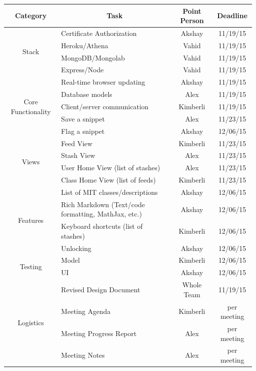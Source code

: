 \documentclass{article}
\begin{document}
 \begin{table}[!htbp]
 \centering
\begin{tabular}{|c| l |c|c|}
\hline
\textbf{Category} & \multicolumn{1}{|c|}{\textbf{Task}} & \textbf{Point Person} & \textbf{Deadline} \\
\hline

\multirow{4}{*}{Stack}
& Certificate Authorization  & Akshay  &  11/19/15 \\\cline{2-4}
& Heroku/Athena    & Vahid  &  11/19/15    \\\cline{2-4}
& MongoDB/Mongolab & Vahid  &  11/19/15    \\\cline{2-4}
& Express/Node  & Vahid  &  11/19/15    \\\cline{2-4}
\hline

\multirow{5}{*}{Core Functionality}
& Real-time browser updating  & Akshay  &  11/19/15 \\\cline{2-4}
& Database models    & Alex  &  11/19/15    \\\cline{2-4}
& Client/server communication & Kimberli  &  11/19/15    \\\cline{2-4}
& Save a snippet & Alex  &  11/23/15    \\\cline{2-4}
& Flag a snippet & Akshay  &  12/06/15    \\\cline{2-4}
\hline

\multirow{4}{*}{Views}
& Feed View  & Kimberli  &  11/23/15 \\\cline{2-4}
& Stash View  & Alex  &  11/23/15    \\\cline{2-4}
& User Home View (list of stashes)  & Alex  &  11/23/15    \\\cline{2-4}
& Class Home View (list of feeds) & Kimberli  &  11/23/15    \\\cline{2-4}
\hline

\multirow{4}{*}{Features}
& List of MIT classes/descriptions  & Akshay  &  12/06/15 \\\cline{2-4}
& Rich Markdown (Text/code formatting, MathJax, etc.)  & Akshay  &  12/06/15    \\\cline{2-4}
& Keyboard shortcuts (list of stashes)  & Kimberli  &  12/06/15    \\\cline{2-4}
& Unlocking  & Akshay  &  12/06/15    \\\cline{2-4}
\hline


\multirow{2}{*}{Testing}
& Model  & Kimberli  &  12/06/15 \\\cline{2-4}
& UI  & Akshay  &  12/06/15    \\\cline{2-4}
\hline

\multirow{4}{*}{Logistics}
& Revised Design Document & Whole Team  &  11/19/15 \\\cline{2-4}
& Meeting Agenda & Kimberli  &  per meeting \\\cline{2-4}
& Meeting Progress Report & Alex  &  per meeting \\\cline{2-4}
& Meeting Notes & Alex  &  per meeting \\\cline{2-4}
\hline

\end{tabular}
\end{table}
\end{document}
